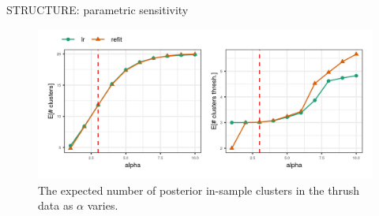 \begin{frame}{STRUCTURE: parametric sensitivity}
  \begin{figure}[!h]
    \centering
    \includegraphics[width = \textwidth]{./figures/stucture_alpha_sens.png}
    \caption*{The expected number of posterior in-sample clusters in the thrush data as $\alpha$ varies.}
  \end{figure}

\end{frame}

